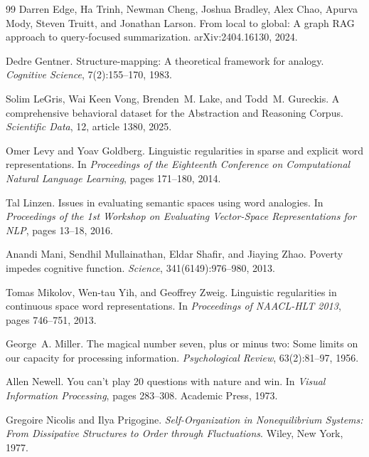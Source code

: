 \documentclass[11pt,a4paper]{article}
\theoremstyle{remark}
\begin{document}
\begin{thebibliography}{99}
Darren Edge, Ha Trinh, Newman Cheng, Joshua Bradley, Alex Chao, Apurva Mody, Steven Truitt, and Jonathan Larson.
\newblock From local to global: A graph RAG approach to query-focused summarization.
\newblock arXiv:2404.16130, 2024.

Dedre Gentner.
\newblock Structure-mapping: A theoretical framework for analogy.
\newblock \emph{Cognitive Science}, 7(2):155--170, 1983.

Solim LeGris, Wai Keen Vong, Brenden~M. Lake, and Todd~M. Gureckis.
\newblock A comprehensive behavioral dataset for the Abstraction and Reasoning Corpus.
\newblock \emph{Scientific Data}, 12, article 1380, 2025.

Omer Levy and Yoav Goldberg.
\newblock Linguistic regularities in sparse and explicit word representations.
\newblock In \emph{Proceedings of the Eighteenth Conference on Computational Natural Language
Learning}, pages 171--180, 2014.

Tal Linzen.
\newblock Issues in evaluating semantic spaces using word analogies.
\newblock In \emph{Proceedings of the 1st Workshop on Evaluating Vector-Space Representations for
NLP}, pages 13--18, 2016.

Anandi Mani, Sendhil Mullainathan, Eldar Shafir, and Jiaying Zhao.
\newblock Poverty impedes cognitive function.
\newblock \emph{Science}, 341(6149):976--980, 2013.

Tomas Mikolov, Wen-tau Yih, and Geoffrey Zweig.
\newblock Linguistic regularities in continuous space word representations.
\newblock In \emph{Proceedings of NAACL-HLT 2013}, pages 746--751, 2013.

George~A. Miller.
\newblock The magical number seven, plus or minus two: Some limits on our capacity for processing information.
\newblock \emph{Psychological Review}, 63(2):81--97, 1956.

Allen Newell.
\newblock You can't play 20 questions with nature and win.
\newblock In \emph{Visual Information Processing}, pages 283--308. Academic Press, 1973.

Gregoire Nicolis and Ilya Prigogine.
\newblock \emph{Self-Organization in Nonequilibrium Systems: From Dissipative Structures to Order through Fluctuations}.
\newblock Wiley, New York, 1977.


\end{thebibliography}
\end{document}
